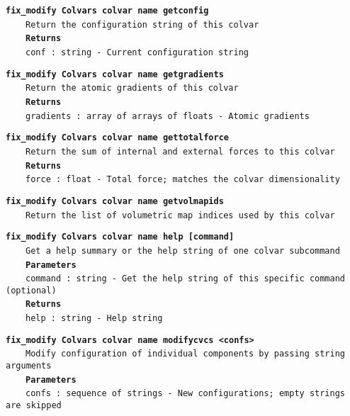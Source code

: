 \begin{mdexampleinput}{}
\texttt{\textbf{fix\_modify Colvars colvar name getconfig}}
\\
\-~~~~\texttt{Return the configuration string of this colvar}
\\
\-~~~~\texttt{\textbf{Returns}}
\\
\-~~~~\texttt{conf : string - Current configuration string}
\end{mdexampleinput}
\begin{mdexampleinput}{}
\texttt{\textbf{fix\_modify Colvars colvar name getgradients}}
\\
\-~~~~\texttt{Return the atomic gradients of this colvar}
\\
\-~~~~\texttt{\textbf{Returns}}
\\
\-~~~~\texttt{gradients : array of arrays of floats - Atomic gradients}
\end{mdexampleinput}
\begin{mdexampleinput}{}
\texttt{\textbf{fix\_modify Colvars colvar name gettotalforce}}
\\
\-~~~~\texttt{Return the sum of internal and external forces to this colvar}
\\
\-~~~~\texttt{\textbf{Returns}}
\\
\-~~~~\texttt{force : float - Total force; matches the colvar dimensionality}
\end{mdexampleinput}
\begin{mdexampleinput}{}
\texttt{\textbf{fix\_modify Colvars colvar name getvolmapids}}
\\
\-~~~~\texttt{Return the list of volumetric map indices used by this colvar}
\end{mdexampleinput}
\begin{mdexampleinput}{}
\texttt{\textbf{fix\_modify Colvars colvar name help [command]}}
\\
\-~~~~\texttt{Get a help summary or the help string of one colvar subcommand}
\\
\-~~~~\texttt{\textbf{Parameters}}
\\
\-~~~~\texttt{command : string - Get the help string of this specific command (optional)}
\\
\-~~~~\texttt{\textbf{Returns}}
\\
\-~~~~\texttt{help : string - Help string}
\end{mdexampleinput}
\begin{mdexampleinput}{}
\texttt{\textbf{fix\_modify Colvars colvar name modifycvcs <confs>}}
\\
\-~~~~\texttt{Modify configuration of individual components by passing string arguments}
\\
\-~~~~\texttt{\textbf{Parameters}}
\\
\-~~~~\texttt{confs : sequence of strings - New configurations; empty strings are skipped}
\end{mdexampleinput}
